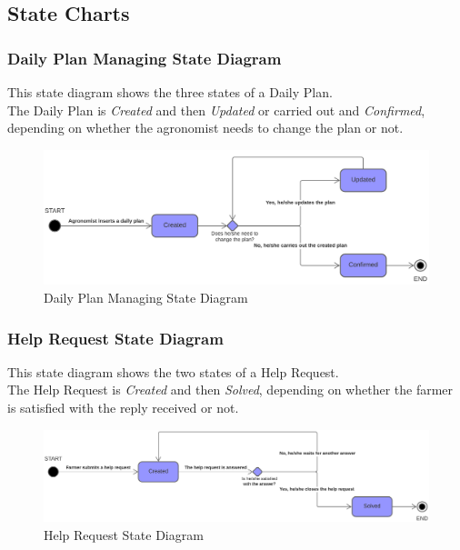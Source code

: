 \subsection{State Charts}

\subsubsection{Daily Plan Managing State Diagram}
This state diagram shows the three states of a Daily Plan.\\
The Daily Plan is \textit{Created} and then \textit{Updated} or carried out and \textit{Confirmed}, depending on whether the agronomist needs to change the plan or not.
\begin{figure}[h!]
  \includegraphics[width=\textwidth,height=\textheight,keepaspectratio]{./Images/State Chart DailyPlan.png}
  \caption{Daily Plan Managing State Diagram}
\end{figure}

\subsubsection{Help Request State Diagram}
This state diagram shows the two states of a Help Request.\\
The Help Request is \textit{Created} and then \textit{Solved}, depending on whether the farmer is satisfied with the reply received or not.
\begin{figure}[h!]
  \includegraphics[width=\textwidth,height=\textheight,keepaspectratio]{./Images/State Chart HelpRequest.png}
  \caption{Help Request State Diagram}
\end{figure}

